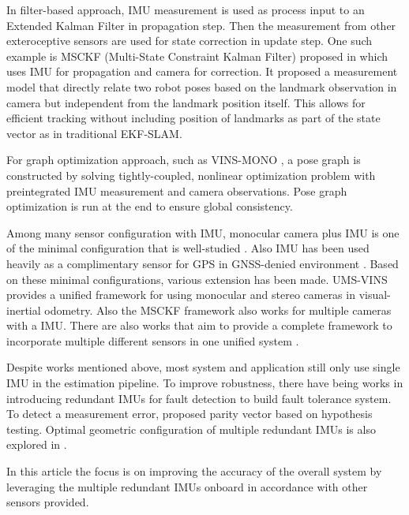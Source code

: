 \documentclass[conference]{IEEEtran}
\begin{document}
In filter-based approach, IMU measurement is used as process input to an Extended Kalman Filter in propagation step. Then the measurement from other exteroceptive sensors are used for state correction in update step. One such example is MSCKF (Multi-State Constraint Kalman Filter) proposed in \cite{Anastasios2007_MSCKF} which uses IMU for propagation and camera for correction. It proposed a measurement model that directly relate two robot poses based on the landmark observation in camera but independent from the landmark position itself. This allows for efficient tracking without including position of landmarks as part of the state vector as in traditional EKF-SLAM.

For graph optimization approach, such as VINS-MONO \cite{qin2018_vins-mono}, a pose graph is constructed by solving tightly-coupled, nonlinear optimization problem with preintegrated IMU measurement and camera observations. Pose graph optimization is run at the end to ensure global consistency.

Among many sensor configuration with IMU, monocular camera plus IMU is one of the minimal configuration that is well-studied \cite{qin2018_vins-mono, 10616216}. Also IMU has been used heavily as a complimentary sensor for GPS in GNSS-denied environment \cite{1008998, 8987949}. Based on these minimal configurations, various extension has been made. UMS-VINS \cite{jiang2023_UMS-VINS} provides a unified framework for using monocular and stereo cameras in visual-inertial odometry. Also the MSCKF framework \cite{Anastasios2007_MSCKF} also works for multiple cameras with a IMU. There are also works that aim to provide a complete framework to incorporate multiple different sensors in one unified system \cite{10587194}.

Despite works mentioned above, most system and application still only use single IMU in the estimation pipeline. To improve robustness, there have being works in introducing redundant IMUs for fault detection to build fault tolerance system. To detect a measurement error, \cite{Sturza1988_redundant} proposed parity vector based on hypothesis testing. Optimal geometric configuration of multiple redundant IMUs is also explored in \cite{Colomina2004REDUNDANTIF, guerrier2009, xue2023}.


 In this article the focus is on improving the accuracy of the overall system by leveraging the multiple redundant IMUs onboard in accordance with other sensors provided.
\end{document}
